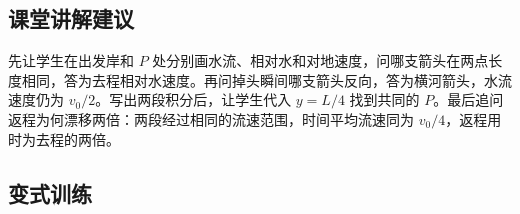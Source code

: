 \documentclass[UTF8,fontset=fandol,a4paper,11pt]{ctexart}
\begin{document}


\subsection*{课堂讲解建议}

先让学生在出发岸和 $P$ 处分别画水流、相对水和对地速度，问哪支箭头在两点长度相同，答为去程相对水速度。再问掉头瞬间哪支箭头反向，答为横河箭头，水流速度仍为 $v_0/2$。写出两段积分后，让学生代入 $y=L/4$ 找到共同的 $P$。最后追问返程为何漂移两倍：两段经过相同的流速范围，时间平均流速同为 $v_0/4$，返程用时为去程的两倍。



\subsection*{变式训练}
\end{document}
